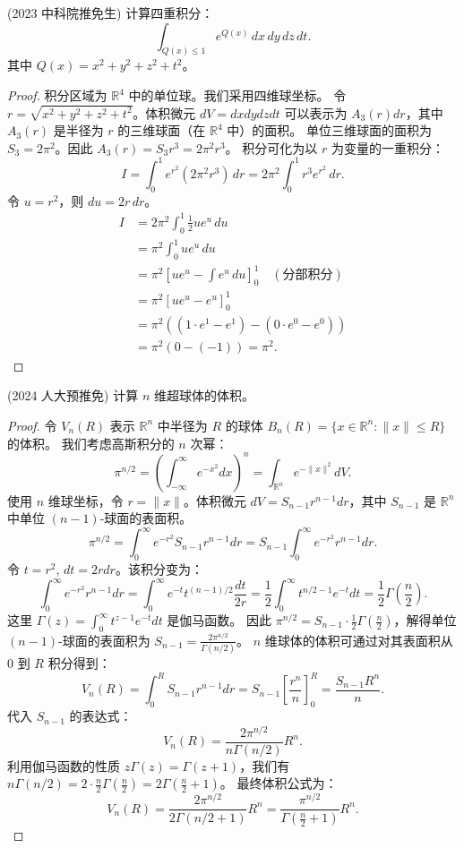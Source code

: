 \documentclass[lang=cn,10pt,thmcnt=section]{elegantbook}
\begin{document}
\begin{example}
    (2023 中科院推免生) 计算四重积分：
\[
\int_{Q(x)\leq 1} e^{Q(x)} \, dx \, dy \, dz \, dt.
\]
其中 $Q(x) = x^2+y^2+z^2+t^2$。
\end{example}

\begin{proof}
积分区域为 $\mathbb{R}^4$ 中的单位球。我们采用四维球坐标。
令 $r = \sqrt{x^2+y^2+z^2+t^2}$。体积微元 $dV = dxdydzdt$ 可以表示为 $A_{3}(r)dr$，其中 $A_{3}(r)$ 是半径为 $r$ 的三维球面（在 $\mathbb{R}^4$ 中）的面积。
单位三维球面的面积为 $S_3 = 2\pi^2$。因此 $A_3(r) = S_3 r^3 = 2\pi^2 r^3$。
积分可化为以 $r$ 为变量的一重积分：
\[
I = \int_0^1 e^{r^2} (2\pi^2 r^3) \, dr = 2\pi^2 \int_0^1 r^3 e^{r^2} \, dr.
\]
令 $u = r^2$，则 $du = 2r \, dr$。
\begin{align*}
I &= 2\pi^2 \int_0^1 \frac{1}{2} u e^u \, du \\
&= \pi^2 \int_0^1 u e^u \, du \\
&= \pi^2 \left[ ue^u - \int e^u \, du \right]_0^1 \quad (\text{分部积分}) \\
&= \pi^2 \left[ ue^u - e^u \right]_0^1 \\
&= \pi^2 \left( (1 \cdot e^1 - e^1) - (0 \cdot e^0 - e^0) \right) \\
&= \pi^2 (0 - (-1)) = \pi^2.
\end{align*}
\end{proof}

\begin{example}
    (2024 人大预推免) 计算 $n$ 维超球体的体积。
\end{example}
\begin{proof}
令 $V_n(R)$ 表示 $\mathbb{R}^n$ 中半径为 $R$ 的球体 $B_n(R) = \{x \in \mathbb{R}^n : \|x\| \le R\}$ 的体积。
我们考虑高斯积分的 $n$ 次幂：
\[
\pi^{n/2} = \left(\int_{-\infty}^{\infty} e^{-x^2} dx\right)^n = \int_{\mathbb{R}^n} e^{-\|x\|^2} dV.
\]
使用 $n$ 维球坐标，令 $r = \|x\|$。体积微元 $dV = S_{n-1} r^{n-1} dr$，其中 $S_{n-1}$ 是 $\mathbb{R}^n$ 中单位 $(n-1)$-球面的表面积。
\[
\pi^{n/2} = \int_0^\infty e^{-r^2} S_{n-1} r^{n-1} dr = S_{n-1} \int_0^\infty e^{-r^2} r^{n-1} dr.
\]
令 $t=r^2$, $dt=2rdr$。该积分变为：
\[
\int_0^\infty e^{-r^2} r^{n-1} dr = \int_0^\infty e^{-t} t^{(n-1)/2} \frac{dt}{2r} = \frac{1}{2} \int_0^\infty t^{n/2-1} e^{-t} dt = \frac{1}{2}\Gamma\left(\frac{n}{2}\right).
\]
这里 $\Gamma(z) = \int_0^\infty t^{z-1}e^{-t}dt$ 是伽马函数。
因此 $\pi^{n/2} = S_{n-1} \cdot \frac{1}{2}\Gamma(\frac{n}{2})$，解得单位 $(n-1)$-球面的表面积为 $S_{n-1} = \frac{2\pi^{n/2}}{\Gamma(n/2)}$。
$n$ 维球体的体积可通过对其表面积从 $0$ 到 $R$ 积分得到：
\[
V_n(R) = \int_0^R S_{n-1} r^{n-1} dr = S_{n-1} \left[\frac{r^n}{n}\right]_0^R = \frac{S_{n-1}R^n}{n}.
\]
代入 $S_{n-1}$ 的表达式：
\[
V_n(R) = \frac{2\pi^{n/2}}{n\Gamma(n/2)} R^n.
\]
利用伽马函数的性质 $z\Gamma(z)=\Gamma(z+1)$，我们有 $n\Gamma(n/2) = 2 \cdot \frac{n}{2} \Gamma(\frac{n}{2}) = 2\Gamma(\frac{n}{2}+1)$。
最终体积公式为：
\[
V_n(R) = \frac{2\pi^{n/2}}{2\Gamma(n/2+1)}R^n = \frac{\pi^{n/2}}{\Gamma(\frac{n}{2}+1)}R^n.
\]
\end{proof}
\end{document}
